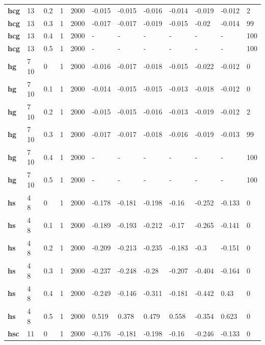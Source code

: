 \begin{longtable}[h]{|p{0.8cm}|p{1.5cm}|p{1cm}|p{1cm}|p{1cm}|p{1cm}|p{1cm}|p{1cm}|p{1cm}|p{1cm}|p{1cm}|p{1.5cm}|}
           \\
  \textbf{hcg } &  13         & 0.2 & 1 & 2000 & -0.015 & -0.015 & -0.016 & -0.014 & -0.019 & -0.012 &   2
           \\
  \textbf{hcg } &  13         & 0.3 & 1 & 2000 & -0.017 & -0.017 & -0.019 & -0.015 &  -0.02 & -0.014 &  99
           \\
  \textbf{hcg } &  13         & 0.4 & 1 & 2000 & - & - & - & - & - & - & 100
           \\
  \textbf{hcg } &  13         & 0.5 & 1 & 2000 & - & - & - & - & - & - & 100
           \\
  \textbf{hg  } &  7 10       &   0 & 1 & 2000 & -0.016 & -0.017 & -0.018 & -0.015 & -0.022 & -0.012 &   0
           \\
  \textbf{hg  } &  7 10       & 0.1 & 1 & 2000 & -0.014 & -0.015 & -0.015 & -0.013 & -0.018 & -0.012 &   0
           \\
  \textbf{hg  } &  7 10       & 0.2 & 1 & 2000 & -0.015 & -0.015 & -0.016 & -0.013 & -0.019 & -0.012 &   2
           \\
  \textbf{hg  } &  7 10       & 0.3 & 1 & 2000 & -0.017 & -0.017 & -0.018 & -0.016 & -0.019 & -0.013 &  99
           \\
  \textbf{hg  } &  7 10       & 0.4 & 1 & 2000 & - & - & - & - & - & - & 100
           \\
  \textbf{hg  } &  7 10       & 0.5 & 1 & 2000 & - & - & - & - & - & - & 100
           \\
  \textbf{hs  } &  4 8        &   0 & 1 & 2000 & -0.178 & -0.181 & -0.198 &  -0.16 & -0.252 & -0.133 &   0
           \\
  \textbf{hs  } &  4 8        & 0.1 & 1 & 2000 & -0.189 & -0.193 & -0.212 &  -0.17 & -0.265 & -0.141 &   0
           \\
  \textbf{hs  } &  4 8        & 0.2 & 1 & 2000 & -0.209 & -0.213 & -0.235 & -0.183 &   -0.3 & -0.151 &   0
           \\
  \textbf{hs  } &  4 8        & 0.3 & 1 & 2000 & -0.237 & -0.248 &  -0.28 & -0.207 & -0.404 & -0.164 &   0
           \\
  \textbf{hs  } &  4 8        & 0.4 & 1 & 2000 & -0.249 & -0.146 & -0.311 & -0.181 & -0.442 &   0.43 &   0
           \\
  \textbf{hs  } &  4 8        & 0.5 & 1 & 2000 &  0.519 &  0.378 &  0.479 &  0.558 & -0.354 &  0.623 &   0
           \\
  \textbf{hsc } &  11         &   0 & 1 & 2000 & -0.176 & -0.181 & -0.198 &  -0.16 & -0.246 & -0.133 &   0

\end{longtable}
